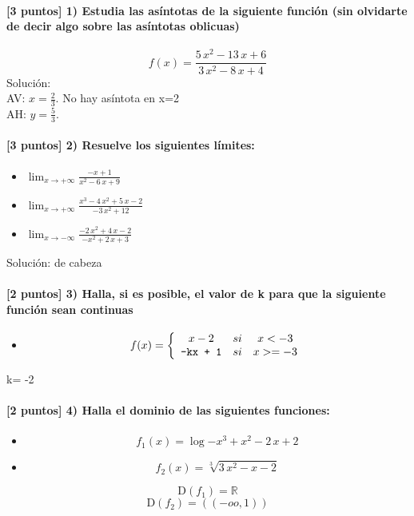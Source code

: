 \paragraph{[3 puntos] 1) Estudia las asíntotas de la siguiente función (sin olvidarte de decir algo sobre las asíntotas oblicuas)} \[f(x) = \frac{ 5 \, x^{2} - 13 \, x + 6 }{ 3 \, x^{2} - 8 \, x + 4 }\] Solución:\\ AV: $x= \frac{2}{3}$. No hay asíntota en x=2 \\ AH: $y= \frac{5}{3} $. \paragraph{[3 puntos] 2) Resuelve los siguientes límites:}\begin{itemize}\item $\displaystyle\lim_{x\to+\infty} \frac{ -x + 1 }{ x^{2} - 6 \, x + 9 }$ \item $\displaystyle\lim_{x\to+\infty} \frac{ x^{3} - 4 \, x^{2} + 5 \, x - 2 }{ -3 \, x^{2} + 12 }$ \item $\displaystyle\lim_{x\to-\infty} \frac{ -2 \, x^{2} + 4 \, x - 2 }{ -x^{2} + 2 \, x + 3 }$\end{itemize}Solución: de cabeza \paragraph{[2 puntos] 3) Halla, si es posible, el valor de k para que la siguiente función sean continuas}\begin{itemize} \item\[ f(x)=\left\{\begin{array}{ccc} x - 2 & si & x<-3 \\ \text{\texttt{{-}kx{ }+{ }1}} & si & x>=-3 \\ \end{array}\right. \] \end{itemize}  k= -2 \paragraph{[2 puntos] 4) Halla el dominio de las siguientes funciones:}\begin{itemize} \item \[f_1(x) = \log{ -x^{3} + x^{2} - 2 \, x + 2 }\] \item \[f_2(x) = \sqrt[3]{ 3 \, x^{2} - x - 2 }\] \end{itemize} \[\text{D}(f_1) = \mathbb{R}\]\[\text{D}(f_2) = ((-oo, 1)) \]